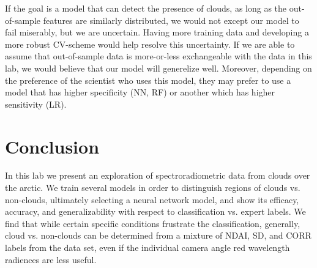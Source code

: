 \documentclass{article}\usepackage[]{graphicx}\usepackage[]{color}
\begin{document}
If the goal is a model that can detect the presence of clouds, as long as the out-of-sample features are similarly distributed, we would not except our model to fail miserably, but we are uncertain. Having more training data and developing a more robust CV-scheme would help resolve this uncertainty. If we are able to assume that out-of-sample data is more-or-less exchangeable with the data in this lab, we would believe that our model will generelize well. Moreover, depending on the preference of the scientist who uses this model, they may prefer to use a model that has higher specificity (NN, RF) or another which has higher sensitivity (LR). 

\section*{Conclusion}

In this lab we present an exploration of spectroradiometric data from clouds over the arctic.
We train several models in order to distinguish regions of clouds vs. non-clouds, ultimately
selecting a neural network model, and show its efficacy, accuracy,
and generalizability with respect to classification vs. expert labels.  We find that while 
certain specific conditions frustrate the classification, generally, cloud vs. non-clouds can be determined
from a mixture of NDAI, SD, and CORR labels from the data set, even if the individual 
camera angle red wavelength radiences are less useful.
\end{document}
